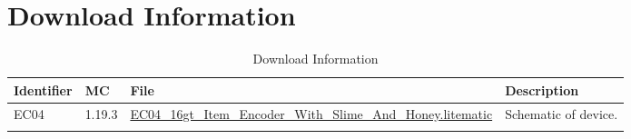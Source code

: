 \documentclass[10pt]{datasheet}
\begin{document}
\section{Download Information}
\begin{table}[h]
    \caption{Download Information}
    \begin{tabularx}{\textwidth}{l | l | l | X}
        \thickhline
        \textbf{Identifier} & \textbf{MC} & \textbf{File} & \textbf{Description} \\
        \hline
        EC04 & 1.19.3 & \href{https://github.com/Soontech-Annals/Archive/blob/8413f90a054b6c415703bae02badeba7541344f6/Archive/encoders/EC04\%2016gt\%20Item\%20Encoder\%20With\%20Slime\%20And\%20Honey/EC04\_16gt\_Item\_Encoder\_With\_Slime\_And\_Honey.litematic?raw=1}{EC04\_16gt\_Item\_Encoder\_With\_Slime\_And\_Honey.litematic} & Schematic of device. \\
        \hline
        \thickhline
    \end{tabularx}
\end{table}
\end{document}
